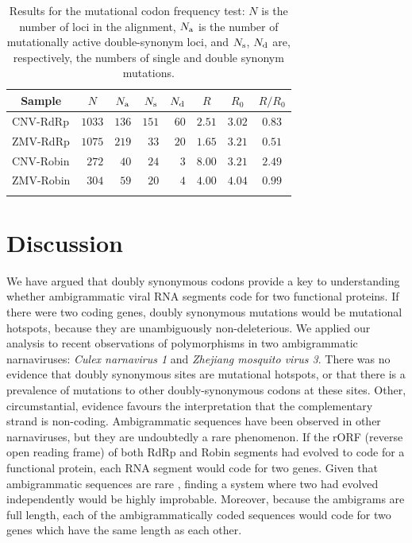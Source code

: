 \documentclass[unnumsec,webpdf,contemporary,large,namedate]{oup-authoring-template}%
\theoremstyle{thmstyleone}%
\theoremstyle{thmstyletwo}%
\theoremstyle{thmstylethree}%
\begin{document}
\begin{table}
\caption{Results for the mutational codon frequency test: $N$ is the number of loci
in the alignment, $N_{\rm a}$ is the number of mutationally active double-synonym loci, and
$N_{\rm s}$, $N_{\rm d}$ are, respectively, the numbers of single and double synonym mutations.
\label{tab: 5.5}}
\begin{tabular*}{\columnwidth}{@{\extracolsep\fill}lrrrrccc@{\extracolsep\fill}}
\toprule
\multicolumn{1}{c}{Sample}&\multicolumn{1}{c}{$N$}&\multicolumn{1}{c}{$N_{\rm a}$}&\multicolumn{1}{c}{$N_{\rm s}$}&\multicolumn{1}{c}{$N_{\rm d}$}&$R$&$R_0$&$R/R_0$\\
\midrule
CNV-RdRp  &$1033$&$136$&$151$&$60$&$2.51$&$3.02$&$0.83$\\
ZMV-RdRp  &$1075$&$219$&$33$&$20$&$1.65$&$3.21$&$0.51$\\
CNV-Robin  &$272$&$40$&$24$&$3$&$8.00$&$3.21$&$2.49$\\
ZMV-Robin  &$304$&$59$&$20$&$4$&$4.00$&$4.04$&$0.99$\\
\botrule
\end{tabular*}
\end{table}

\section{Discussion}
\label{sec: 6}

We have argued that doubly synonymous codons provide a key to understanding whether
ambigrammatic viral RNA segments code for two functional proteins. If there were two
coding genes, doubly synonymous mutations would be mutational hotspots,
because they are unambiguously non-deleterious. We applied our analysis to recent
observations of polymorphisms in two ambigrammatic narnaviruses: \emph{Culex narnavirus 1}
and \emph{Zhejiang mosquito virus 3}. There was no evidence that doubly synonymous
sites are mutational hotspots, or that there is a prevalence of mutations to other doubly-synonymous codons
at these sites. Other, circumstantial, evidence favours the interpretation that the complementary strand is non-coding.
Ambigrammatic sequences have been observed in other narnaviruses,
but they are undoubtedly a rare phenomenon.
If the rORF (reverse open reading frame) of both RdRp and Robin segments
had evolved to code for a functional protein, each RNA segment would code for two genes.
Given that ambigrammatic sequences are rare \citep{DeR+19}, finding a system where two had evolved
independently would be highly improbable. Moreover, because the ambigrams are full length,
each of the ambigrammatically coded sequences would code for two genes which have the same
length as each other.
\end{document}
